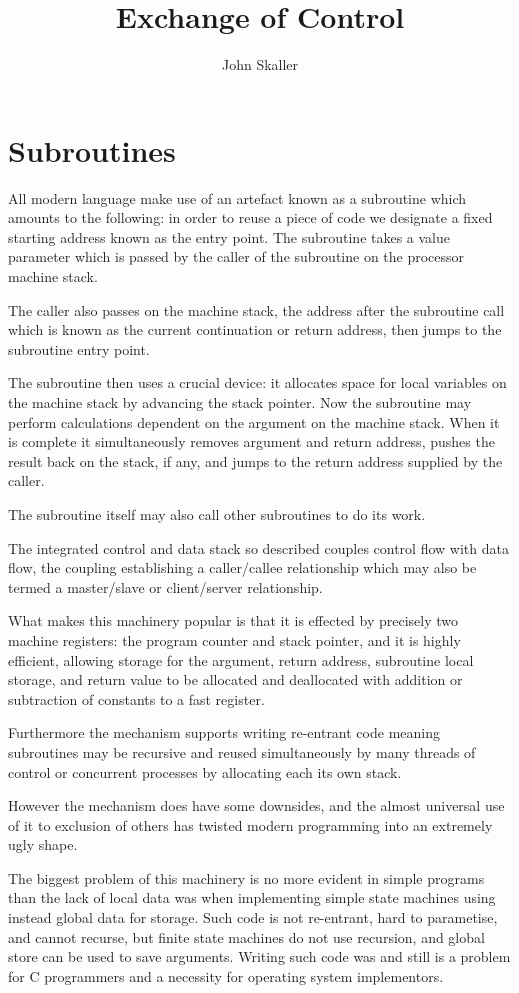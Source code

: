 \documentclass{article}
\title{Exchange of Control}
\author{John Skaller}
\begin{document}
\maketitle
\section{Subroutines}
All modern language make use of an artefact known as a subroutine
which amounts to the following: in order to reuse a piece of code
we designate a fixed starting address known as the entry
point. The subroutine takes a value parameter which is passed by
the caller of the subroutine on the processor machine stack.

The caller also passes on the machine stack, the address after the 
subroutine call which is known as the current continuation or return address, 
then jumps to the subroutine entry point.

The subroutine then uses a crucial device: it allocates space 
for local variables on the machine stack by advancing the stack pointer.
Now the subroutine may perform calculations dependent on the 
argument on the machine stack. When it is complete it simultaneously
removes argument and return address, pushes the result back on the
stack, if any, and jumps to the return address supplied by the caller.

The subroutine itself may also call other subroutines to do its work.

The integrated control and data stack so described couples control
flow with data flow, the coupling establishing a caller/callee
relationship which may also be termed a master/slave or client/server
relationship.

What makes this machinery popular is that it is effected by precisely
two machine registers: the program counter and stack pointer, and
it is highly efficient, allowing storage for the argument, return
address, subroutine local storage, and return value to be allocated
and deallocated with addition or subtraction of constants to a 
fast register.

Furthermore the mechanism supports writing re-entrant code meaning
subroutines may be recursive and reused simultaneously by many
threads of control or concurrent processes by allocating each 
its own stack.

However the mechanism does have some downsides, and the almost universal
use of it to exclusion of others has twisted modern programming
into an extremely ugly shape.

The biggest problem of this machinery is no more evident in simple
programs than the lack of local data was when implementing simple
state machines using instead global data for storage. Such code is
not re-entrant, hard to parametise, and cannot recurse, but finite
state machines do not use recursion, and global store can be used
to save arguments. Writing such code was and still is a problem
for C programmers and a necessity for operating system implementors.
\end{document}
